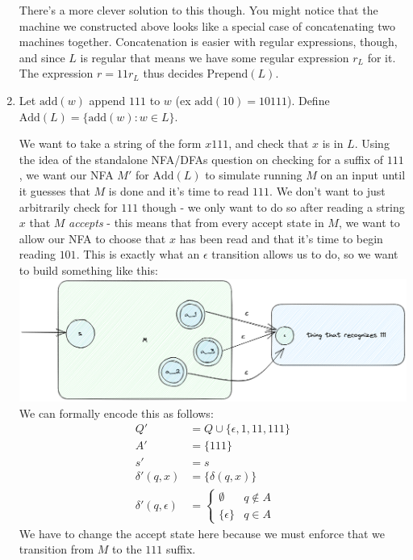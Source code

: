 \documentclass[fleqn]{article}
\begin{document}
\begin{enumerate}
\begin{answer}
        There's a more clever solution to this though. You might notice that the machine we constructed above looks like a special case of concatenating two machines together. Concatenation is easier with regular expressions, though, and since $L$ is regular that means we have some regular expression $r_L$ for it. The expression $r = 11r_L$ thus decides $\text{Prepend}(L)$.
    \end{answer}
    \item Let $\text{add}(w)$ append $111$ to $w$ (ex $\text{add}(10) = 10111$). Define $\text{Add}(L) = \{\text{add}(w) : w \in L\}$.
    \begin{answer}
        We want to take a string of the form $x111$, and check that $x$ is in $L$. Using the idea of the standalone NFA/DFAs question on checking for a suffix of $111$, we want our NFA $M'$ for $\text{Add}(L)$ to simulate running $M$ on an input until it guesses that $M$ is done and it's time to read $111$. We don't want to just arbitrarily check for $111$ though - we only want to do so after reading a string $x$ that $M$ \textit{accepts} - this means that from every accept state in $M$, we want to allow our NFA to choose that $x$ has been read and that it's time to begin reading $101$. This is exactly what an $\epsilon$ transition allows us to do, so we want to build something like this: \\
        \includegraphics[width=6.25in]{figures/add_nfa.png}
        We can formally encode this as follows:
        \[
            \begin{aligned}
                Q' &= Q \cup \{\epsilon, 1, 11, 111\} \\
                A' &= \{111\} \\
                s' &= s \\
                \delta'(q,x) &= \{\delta(q,x)\} \\
                \delta'(q,\epsilon) &= \begin{cases}
                    \emptyset & q \notin A \\
                    \{\epsilon\} & q \in A
                \end{cases}
            \end{aligned}
        \]
        We have to change the accept state here because we must enforce that we transition from $M$ to the $111$ suffix.


\end{answer}
\end{enumerate}
\end{document}
